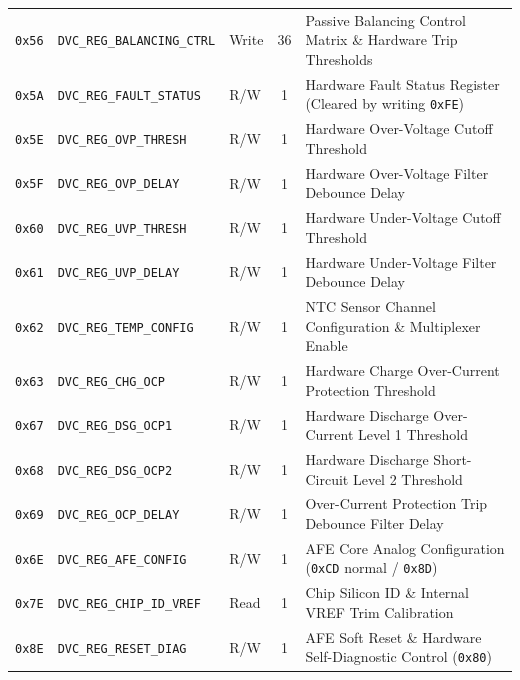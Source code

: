 \documentclass[10pt,a4paper]{article}
\begin{document}
\begin{longtable}{lllcp{7.5cm}}
\texttt{0x56} & \texttt{DVC\_REG\_BALANCING\_CTRL} & Write & 36 & Passive Balancing Control Matrix \& Hardware Trip Thresholds \\
\texttt{0x5A} & \texttt{DVC\_REG\_FAULT\_STATUS} & R/W & 1 & Hardware Fault Status Register (Cleared by writing \texttt{0xFE}) \\
\texttt{0x5E} & \texttt{DVC\_REG\_OVP\_THRESH} & R/W & 1 & Hardware Over-Voltage Cutoff Threshold \\
\texttt{0x5F} & \texttt{DVC\_REG\_OVP\_DELAY} & R/W & 1 & Hardware Over-Voltage Filter Debounce Delay \\
\texttt{0x60} & \texttt{DVC\_REG\_UVP\_THRESH} & R/W & 1 & Hardware Under-Voltage Cutoff Threshold \\
\texttt{0x61} & \texttt{DVC\_REG\_UVP\_DELAY} & R/W & 1 & Hardware Under-Voltage Filter Debounce Delay \\
\texttt{0x62} & \texttt{DVC\_REG\_TEMP\_CONFIG} & R/W & 1 & NTC Sensor Channel Configuration \& Multiplexer Enable \\
\texttt{0x63} & \texttt{DVC\_REG\_CHG\_OCP} & R/W & 1 & Hardware Charge Over-Current Protection Threshold \\
\texttt{0x67} & \texttt{DVC\_REG\_DSG\_OCP1} & R/W & 1 & Hardware Discharge Over-Current Level 1 Threshold \\
\texttt{0x68} & \texttt{DVC\_REG\_DSG\_OCP2} & R/W & 1 & Hardware Discharge Short-Circuit Level 2 Threshold \\
\texttt{0x69} & \texttt{DVC\_REG\_OCP\_DELAY} & R/W & 1 & Over-Current Protection Trip Debounce Filter Delay \\
\texttt{0x6E} & \texttt{DVC\_REG\_AFE\_CONFIG} & R/W & 1 & AFE Core Analog Configuration (\texttt{0xCD} normal / \texttt{0x8D}) \\
\texttt{0x7E} & \texttt{DVC\_REG\_CHIP\_ID\_VREF} & Read & 1 & Chip Silicon ID \& Internal VREF Trim Calibration \\
\texttt{0x8E} & \texttt{DVC\_REG\_RESET\_DIAG} & R/W & 1 & AFE Soft Reset \& Hardware Self-Diagnostic Control (\texttt{0x80}) \\
\end{longtable}
\end{document}
